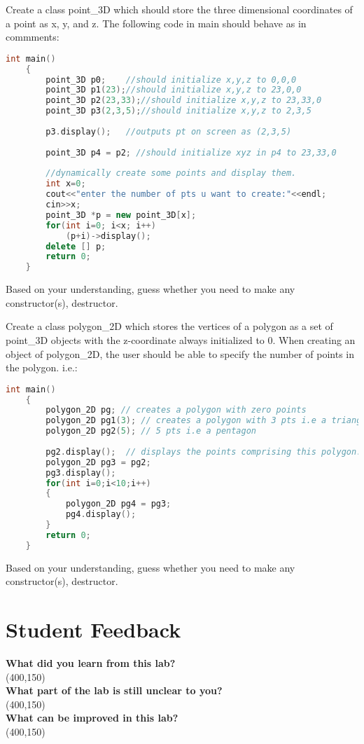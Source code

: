 \documentclass[11pt,fleqn]{book} %
\begin{document}
\begin{problem} Create a class point\_3D which should store the three dimensional coordinates of a point as x, y, and z. The following code in main should behave as in commments:
	\begin{lstlisting}[language=C++, caption = Create class point\_3D]
	int main()
	{
		point_3D p0;	//should initialize x,y,z to 0,0,0
		point_3D p1(23);//should initialize x,y,z to 23,0,0
		point_3D p2(23,33);//should initialize x,y,z to 23,33,0
		point_3D p3(2,3,5);//should initialize x,y,z to 2,3,5
		
		p3.display();	//outputs pt on screen as (2,3,5)
		
		point_3D p4 = p2; //should initialize xyz in p4 to 23,33,0
		
		//dynamically create some points and display them.
		int x=0;
		cout<<"enter the number of pts u want to create:"<<endl;
		cin>>x;
		point_3D *p = new point_3D[x];
		for(int i=0; i<x; i++)
			(p+i)->display();
		delete [] p;		
		return 0;
	}
	\end{lstlisting}
	
\noindent Based on your understanding, guess whether you need to make any constructor(s), destructor.\\
\end{problem}
\begin{problem} Create a class polygon\_2D which stores the vertices of a polygon as a set of point\_3D objects with the z-coordinate always initialized to 0. When creating an object of polygon\_2D, the user should be able to specify the number of points in the polygon. i.e.:
	\begin{lstlisting}[language=C++, caption = Create class polygon\_2D]
	int main() 
	{
		polygon_2D pg; // creates a polygon with zero points
		polygon_2D pg1(3); // creates a polygon with 3 pts i.e a triangle
		polygon_2D pg2(5); // 5 pts i.e a pentagon
		
		pg2.display(); 	// displays the points comprising this polygon. 
		polygon_2D pg3 = pg2;
		pg3.display();
		for(int i=0;i<10;i++)
		{
			polygon_2D pg4 = pg3;
			pg4.display();
		}		
		return 0;
	}
	\end{lstlisting}	
	Based on your understanding, guess whether you need to make any constructor(s), destructor.\\
\end{problem}

\section{Student Feedback}
\textbf{What did you learn from this lab?}\\ 
\framebox(400,150){}\\
\textbf{What part of the lab is still unclear to you?}\\
\framebox(400,150){}\\
\textbf{What can be improved in this lab?}\\ 
\framebox(400,150){}\\
\end{document}
